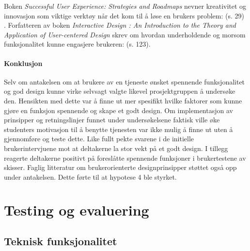 Boken {\em Successful User Experience: Strategies and Roadmaps} nevner kreativitet og innovasjon som viktige verktøy når det kom til å løse en brukers problem:  (s. 29) \cite{SUCCESSFUL-UX:18}. Forfatteren av boken {\em Interactive Design : An Introduction to the Theory and Application of User-centered Design} skrev om hvordan underholdende og morsom funksjonalitet kunne engasjere brukeren:  (s. 123). \cite{INTERACTIVE-DESIGN:19}

\paragraph{Konklusjon}
Selv om antakelsen om at brukere av en tjeneste ønsket spennende funksjonalitet og god design kunne virke selvsagt valgte likevel prosjektgruppen å undersøke den. Hensikten med dette var å finne ut mer spesifikt hvilke faktorer som kunne gjøre en funksjon spennende og skape et godt design. Om implementasjon av prinsipper og retningslinjer funnet under undersøkelsene faktisk ville øke studenters motivasjon til å benytte tjenesten var ikke mulig å finne ut uten å gjennomføre og teste dette. Like fullt pekte svarene i de initielle brukerintervjuene mot at deltakerne la stor vekt på et godt design. I tillegg reagerte deltakerne positivt på foreslåtte spennende funksjoner i brukertestene av skisser. Faglig litteratur om brukerorienterte designprinsipper støttet også opp under antakelsen. Dette førte til at hypotese 4 ble styrket.


\section{Testing og evaluering}

\subsection{Teknisk funksjonalitet}

